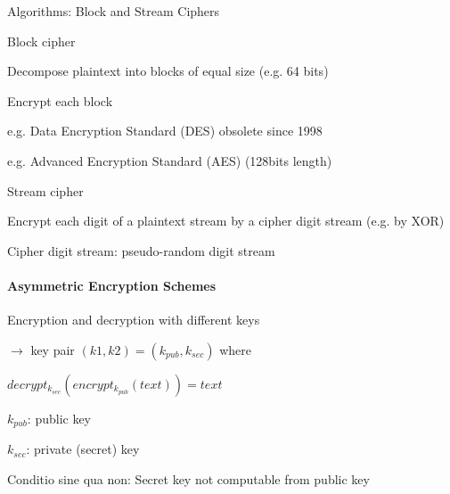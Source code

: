 \documentclass[a4paper]{article}
\begin{document}
\begin{multicols}{3}
    Algorithms: Block and Stream Ciphers
    \begin{itemize*}
        \item Block cipher
        \begin{itemize*}
            \item Decompose plaintext into blocks of equal size (e.g. 64 bits)
            \item Encrypt each block
            \item e.g. Data Encryption Standard (DES) obsolete since 1998
            \item e.g. Advanced Encryption Standard (AES) (128bits length)
        \end{itemize*}
        \item Stream cipher
        \begin{itemize*}
            \item Encrypt each digit of a plaintext stream by a cipher digit stream (e.g. by XOR)
            \item Cipher digit stream: pseudo-random digit stream
        \end{itemize*}
    \end{itemize*}

    \paragraph{Asymmetric Encryption Schemes}
    Encryption and decryption with different keys
    \begin{itemize*}
        \item[$\rightarrow$] key pair $(k1,k2) = (k_{pub} , k_{sec})$ where
        \item $decrypt_{k_{sec}} ( encrypt_{k_{pub}} (text)) = text$
        \item $k_{pub}$: public key
        \item $k_{sec}$: private (secret) key
        \item Conditio sine qua non: Secret key not computable from public key
    \end{itemize*}


\end{multicols}
\end{document}
